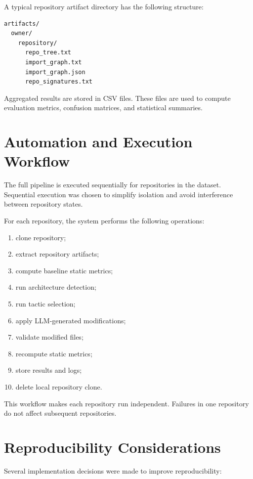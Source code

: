 A typical repository artifact directory has the following structure:

\begin{verbatim}
artifacts/
  owner/
    repository/
      repo_tree.txt
      import_graph.txt
      import_graph.json
      repo_signatures.txt
\end{verbatim}

Aggregated results are stored in CSV files. These files are used to compute evaluation metrics, confusion matrices, and statistical summaries.

\section{Automation and Execution Workflow}

The full pipeline is executed sequentially for repositories in the dataset. Sequential execution was chosen to simplify isolation and avoid interference between repository states.

For each repository, the system performs the following operations:

\begin{enumerate}
    \item clone repository;
    \item extract repository artifacts;
    \item compute baseline static metrics;
    \item run architecture detection;
    \item run tactic selection;
    \item apply LLM-generated modifications;
    \item validate modified files;
    \item recompute static metrics;
    \item store results and logs;
    \item delete local repository clone.
\end{enumerate}

This workflow makes each repository run independent. Failures in one repository do not affect subsequent repositories.

\section{Reproducibility Considerations}

Several implementation decisions were made to improve reproducibility:

